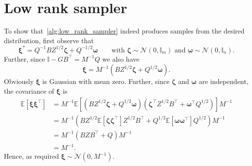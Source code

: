 \documentclass[11pt]{article}
\renewcommand{\vec}[1]{\boldsymbol{#1}}
\begin{document}
\section{Low rank sampler}\label{sec:low_rank_sampler}
To show that~\cref{alg:low_rank_sampler} indeed produces samples from the desired distribution, first observe that
\begin{equation}
\vec{\xi}^* = Q^{-1} B Z^{1/2} \vec{\zeta} + Q^{-1/2} \vec{\omega}\qquad\text{with $\vec{\zeta}\sim\mathcal{N}(0,\mathbb{I}_m)$ and $\vec{\omega}\sim\mathcal{N}(0,\mathbb{I}_n)$.}
\end{equation}
Further, since $\mathbb{I}-GB^\top = M^{-1}Q$ we also have
\begin{equation}
\vec{\xi} = M^{-1} \left(B Z^{1/2} \vec{\zeta} + Q^{1/2} \vec{\omega}\right).
\end{equation}
Obviously $\vec{\xi}$ is Gaussian with mean zero. Further, since $\vec{\zeta}$ and $\vec{\omega}$ are independent, the covariance of $\vec{\xi}$ is
\begin{equation}
    \begin{aligned}
\mathbb{E}[\vec{\xi}\vec{\xi}^\top] &= M^{-1} \mathbb{E}\left[\left(B Z^{1/2} \vec{\zeta} + Q^{1/2} \vec{\omega}\right)\left(\vec{\zeta}^\top Z^{1/2} B^\top +  \vec{\omega}^\top Q^{1/2}\right)\right]M^{-1}\\
&= M^{-1} \left(B Z^{1/2} \mathbb{E}\left[\vec{\zeta}\vec{\zeta}^\top\right]Z^{1/2} B^\top + Q^{1/2} \mathbb{E}\left[\vec{\omega}\vec{\omega}^\top\right] Q^{1/2}\right)M^{-1}\\
&= M^{-1}\left(BZB^\top + Q\right)M^{-1} \\
&= M^{-1}.
    \end{aligned}
\end{equation}
Hence, as required $\vec{\xi}\sim\mathcal{N}(0,M^{-1})$.


\end{document}
